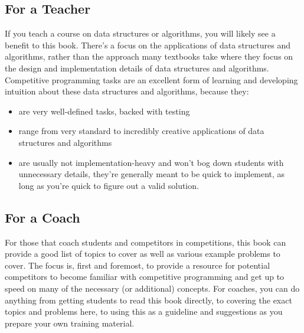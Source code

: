 \subsection*{For a Teacher}

If you teach a course on data structures or algorithms, you will likely see a benefit to this book. There's a focus on the applications of data structures and algorithms, rather than the approach many textbooks take where they focus on the design and implementation details of data structures and algorithms. Competitive programming tasks are an excellent form of learning and developing intuition about these data structures and algorithms, because they:
\begin{itemize}
\item are very well-defined tasks, backed with testing
\item range from very standard to incredibly creative applications of data structures and algorithms
\item are usually not implementation-heavy and won't bog down students with unnecessary details, they're generally meant to be quick to implement, as long as you're quick to figure out a valid solution.
\end{itemize}

\subsection*{For a Coach}

For those that coach students and competitors in competitions, this book can provide a good list of topics to cover as well as various example problems to cover. The focus is, first and foremost, to provide a resource for potential competitors to become familiar with competitive programming and get up to speed on many of the necessary (or additional) concepts. For coaches, you can do anything from getting students to read this book directly, to covering the exact topics and problems here, to using this as a guideline and suggestions as you prepare your own training material.
